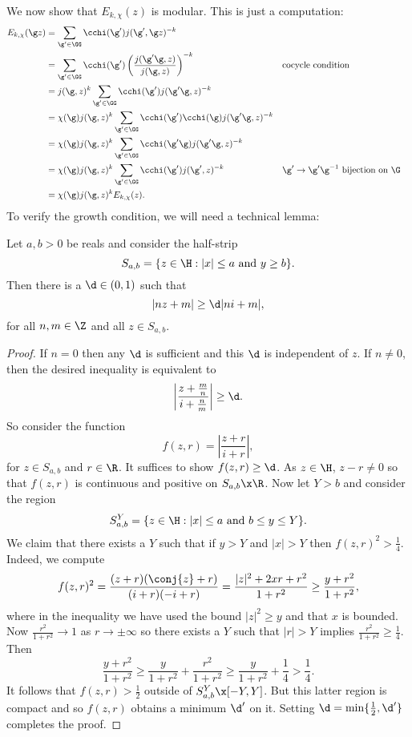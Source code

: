     We now show that $E_{k,\chi}(z)$ is modular. This is just a computation:
    \begin{align*}
      E_{k,\chi}(\g z) &= \sum_{\g' \in \GG}\cchi(\g')j(\g',\g z)^{-k} \\
      &= \sum_{\g' \in \GG}\cchi(\g')\left(\frac{j(\g'\g,z)}{j(\g,z)}\right)^{-k} && \text{cocycle condition} \\
      &= j(\g,z)^{k}\sum_{\g' \in \GG}\cchi(\g')j(\g'\g,z)^{-k} \\
      &= \chi(\g)j(\g,z)^{k}\sum_{\g' \in \GG}\cchi(\g')\cchi(\g)j(\g'\g,z)^{-k} \\
      &= \chi(\g)j(\g,z)^{k}\sum_{\g' \in \GG}\cchi(\g'\g)j(\g'\g,z)^{-k} \\
      &= \chi(\g)j(\g,z)^{k}\sum_{\g' \in \GG}\cchi(\g')j(\g',z)^{-k} && \text{$\g' \to \g'\g^{-1}$ bijection on $\G$} \\
      &= \chi(\g)j(\g,z)^{k}E_{k,\chi}(z).
    \end{align*}
    To verify the growth condition, we will need a technical lemma:

    \begin{lemma}\label{lem:technical_Eisenstein_convergence_lemma}
      Let $a,b > 0$ be reals and consider the half-strip
      \[
        S_{a,b} = \{z \in \H:\text{$|x| \le a$ and $y \ge b$}\}.
      \]
      Then there is a $\d \in (0,1)$ such that
      \[
        |nz+m| \ge \d|ni+m|,
      \]
      for all $n,m \in \Z$ and all $z \in S_{a,b}$.
    \end{lemma}
    \begin{proof}
      If $n = 0$ then any $\d$ is sufficient and this $\d$ is independent of $z$. If $n \neq 0$, then the desired inequality is equivalent to
      \[
        \left|\frac{z+\frac{m}{n}}{i+\frac{n}{m}}\right| \ge \d.
      \]
      So consider the function
      \[
        f(z,r) = \left|\frac{z+r}{i+r}\right|,
      \]
      for $z \in S_{a,b}$ and $r \in \R$. It suffices to show $f(z,r) \ge \d$. As $z \in \H$, $z-r \neq 0$ so that $f(z,r)$ is continuous and positive on $S_{a,b} \x \R$. Now let $Y > b$ and consider the region
      \[
        S_{a,b}^{Y} = \{z \in \H:\text{$|x| \le a$ and $b \le y \le Y$}\}.
      \]
      We claim that there exists a $Y$ such that if $y > Y$ and $|x| > Y$ then $f(z,r)^{2} > \frac{1}{4}$. Indeed, we compute
      \[
        f(z,r)^{2} = \frac{(z+r)(\conj{z}+r)}{(i+r)(-i+r)} = \frac{|z|^{2}+2xr+r^{2}}{1+r^{2}} \ge \frac{y+r^{2}}{1+r^{2}},
      \]
      where in the inequality we have used the bound $|z|^{2} \ge y$ and that $x$ is bounded. Now $\frac{r^{2}}{1+r^{2}} \to 1$ as $r \to \pm\infty$ so there exists a $Y$ such that $|r| > Y$ implies $\frac{r^{2}}{1+r^{2}} \ge \frac{1}{4}$. Then
      \[
        \frac{y+r^{2}}{1+r^{2}} \ge \frac{y}{1+r^{2}}+\frac{r^{2}}{1+r^{2}} \ge \frac{y}{1+r^{2}}+\frac{1}{4} > \frac{1}{4}.
      \]
      It follows that $f(z,r) > \frac{1}{2}$ outside of $S_{a,b}^{Y} \x [-Y,Y]$. But this latter region is compact and so $f(z,r)$ obtains a minimum $\d'$ on it. Setting $\d = \min\{\frac{1}{2},\d'\}$ completes the proof.
    \end{proof}

